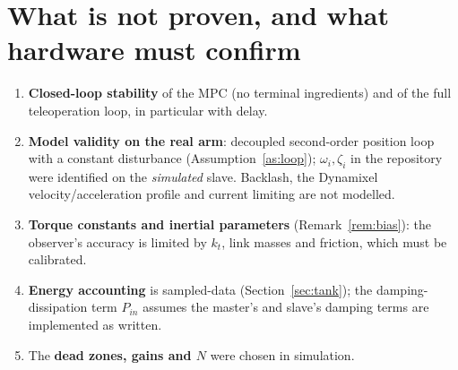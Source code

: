\documentclass[11pt,a4paper]{article}
\theoremstyle{remark}
\theoremstyle{definition}
\begin{document}
\section{What is not proven, and what hardware must confirm}\label{sec:limits}
\begin{enumerate}[leftmargin=*,itemsep=2pt]
\item \textbf{Closed-loop stability} of the MPC (no terminal ingredients) and of the full teleoperation loop, in particular with delay.
\item \textbf{Model validity on the real arm}: decoupled second-order position loop with a constant disturbance (Assumption~\ref{as:loop}); $\omega_i,\zeta_i$ in the repository were identified on the \emph{simulated} slave.
Backlash, the Dynamixel velocity/acceleration profile and current limiting are not modelled.
\item \textbf{Torque constants and inertial parameters} (Remark~\ref{rem:bias}): the observer's accuracy is limited by $k_t$, link masses and friction, which must be calibrated.
\item \textbf{Energy accounting} is sampled-data (Section~\ref{sec:tank}); the damping-dissipation term $P_{in}$ assumes the master's and slave's damping terms are implemented as written.
\item The \textbf{dead zones, gains and $N$} were chosen in simulation.
\end{enumerate}
\end{document}
